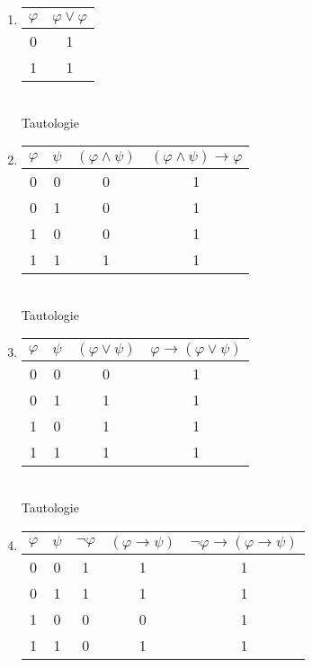\documentclass[11pt]{article}
\begin{document}
\begin{enumerate}[label=(\arabic*)]

  \item
  \begin{tabular}{c|c}
  $\varphi$ & $\varphi \vee \varphi$ \\
  \hline
  0 & 1 \\
  1 & 1 \\
  \end{tabular} \\

  Tautologie

  \item
  \begin{tabular}{cc|c|c}
  $\varphi$ & $\psi$ & $(\varphi \wedge \psi)$
    & $(\varphi \wedge \psi) \rightarrow \varphi$ \\
  \hline
  0 & 0 & 0 & 1\\
  0 & 1 & 0 & 1\\
  1 & 0 & 0 & 1\\
  1 & 1 & 1 & 1\\
  \end{tabular} \\

  Tautologie

  \item
  \begin{tabular}{cc|c|c}
  $\varphi$ & $\psi$ & $(\varphi \vee \psi)$
    & $\varphi \rightarrow (\varphi \vee \psi)$ \\
  \hline
  0 & 0 & 0 & 1\\
  0 & 1 & 1 & 1\\
  1 & 0 & 1 & 1\\
  1 & 1 & 1 & 1\\
  \end{tabular} \\

  Tautologie

  \item
  \begin{tabular}{cc|cc|c}
  $\varphi$ & $\psi$ & $\neg \varphi$ & $(\varphi \rightarrow \psi)$
    & $\neg \varphi \rightarrow (\varphi \rightarrow \psi)$ \\
  \hline
  0 & 0 & 1 & 1 & 1\\
  0 & 1 & 1 & 1 & 1\\
  1 & 0 & 0 & 0 & 1\\
  1 & 1 & 0 & 1 & 1\\
  \end{tabular} \\


\end{enumerate}
\end{document}
